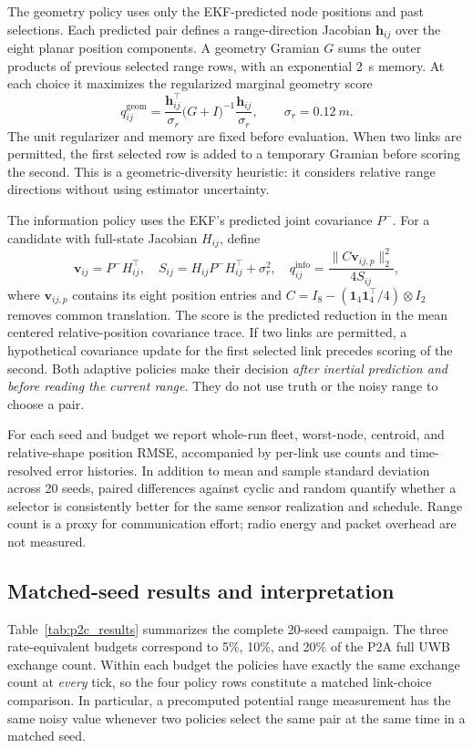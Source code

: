 The geometry policy uses only the EKF-predicted node positions and past selections. Each predicted pair defines a range-direction Jacobian \(\bm h_{ij}\) over the eight planar position components. A geometry Gramian \(G\) sums the outer products of previous selected range rows, with an exponential \SI{2}{s} memory. At each choice it maximizes the regularized marginal geometry score
\begin{equation}
    q_{ij}^{\mathrm{geom}} =
    \frac{\bm h_{ij}^{\top}}{\sigma_r}
    \bigl(G+I\bigr)^{-1}
    \frac{\bm h_{ij}}{\sigma_r},
    \qquad \sigma_r=\SI{0.12}{m}.
\end{equation}
The unit regularizer and memory are fixed before evaluation. When two links are permitted, the first selected row is added to a temporary Gramian before scoring the second. This is a geometric-diversity heuristic: it considers relative range directions without using estimator uncertainty.

The information policy uses the EKF's predicted joint covariance \(P^-\). For a candidate with full-state Jacobian \(H_{ij}\), define
\begin{equation}
    \bm v_{ij}=P^-H_{ij}^{\top},\quad
    S_{ij}=H_{ij}P^-H_{ij}^{\top}+\sigma_r^2,\quad
    q_{ij}^{\mathrm{info}}=
    \frac{\|C\bm v_{ij,p}\|_2^2}{4S_{ij}},
\end{equation}
where \(\bm v_{ij,p}\) contains its eight position entries and \(C=I_8-(\bm1_4\bm1_4^\top/4)\otimes I_2\) removes common translation. The score is the predicted reduction in the mean centered relative-position covariance trace. If two links are permitted, a hypothetical covariance update for the first selected link precedes scoring of the second. Both adaptive policies make their decision \emph{after inertial prediction and before reading the current range}. They do not use truth or the noisy range to choose a pair.

For each seed and budget we report whole-run fleet, worst-node, centroid, and relative-shape position RMSE, accompanied by per-link use counts and time-resolved error histories. In addition to mean and sample standard deviation across 20 seeds, paired differences against cyclic and random quantify whether a selector is consistently better for the same sensor realization and schedule. Range count is a proxy for communication effort; radio energy and packet overhead are not measured.

\subsection{Matched-seed results and interpretation}
Table~\ref{tab:p2c_results} summarizes the complete 20-seed campaign. The three rate-equivalent budgets correspond to 5\%, 10\%, and 20\% of the P2A full UWB exchange count. Within each budget the policies have exactly the same exchange count at \emph{every} tick, so the four policy rows constitute a matched link-choice comparison. In particular, a precomputed potential range measurement has the same noisy value whenever two policies select the same pair at the same time in a matched seed.

